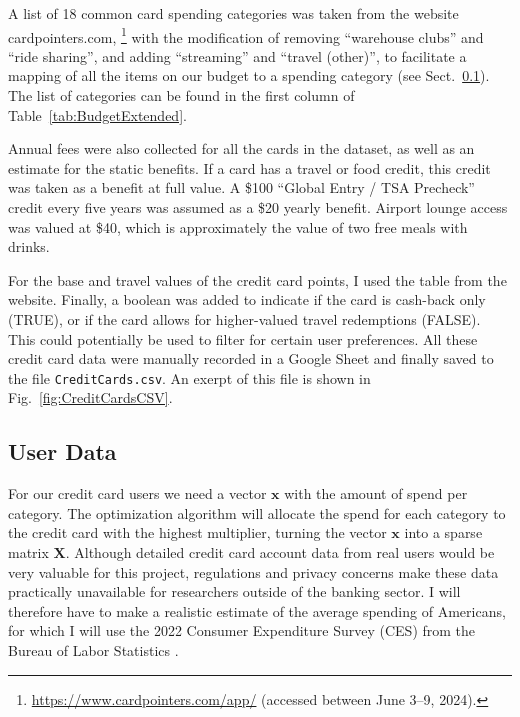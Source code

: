 A list of 18 common card spending categories was taken from the website cardpointers.com,%
\footnote{\url{https://www.cardpointers.com/app/} (accessed between June 3--9, 2024).}
with the modification of removing ``warehouse clubs'' and ``ride sharing'', and adding ``streaming'' and ``travel (other)'', to facilitate a mapping of all the items on our budget to a spending category (see Sect.~\ref{subsec:UserData}). The list of categories can be found in the first column of Table~\ref{tab:BudgetExtended}.

Annual fees were also collected for all the cards in the dataset, as well as an estimate for the static benefits. If a card has a travel or food credit, this credit was taken as a benefit at full value. A \$100 ``Global Entry / TSA Precheck'' credit every five years was assumed as a \$20 yearly benefit. Airport lounge access was valued at \$40, which is approximately the value of two free meals with drinks. 

For the base and travel values of the credit card points, I used the table from the \citet{nerdwallet:2024} website. 
Finally, a boolean was added to indicate if the card is cash-back only (TRUE), or if the card allows for higher-valued travel redemptions (FALSE).
This could potentially be used to filter for certain user preferences.
All these credit card data were manually recorded in a Google Sheet and finally saved to the file \texttt{CreditCards.csv}. An exerpt of this file is shown in Fig.~\ref{fig:CreditCardsCSV}.

\subsection{User Data} \label{subsec:UserData}

For our credit card users we need a vector $\mathbf{x}$ with the amount of spend per category. The optimization algorithm will allocate the spend for each category to the credit card with the highest multiplier, turning the vector $\mathbf{x}$ into a sparse matrix $\mathbf{X}$. 
Although detailed credit card account data from real users would be very valuable for this project, regulations and privacy concerns make these data practically unavailable for researchers outside of the banking sector.  
I will therefore have to make a realistic estimate of the average spending of Americans, for which I will use the 2022 Consumer Expenditure Survey (CES) from the Bureau of Labor Statistics \citep{bls:2023}.

